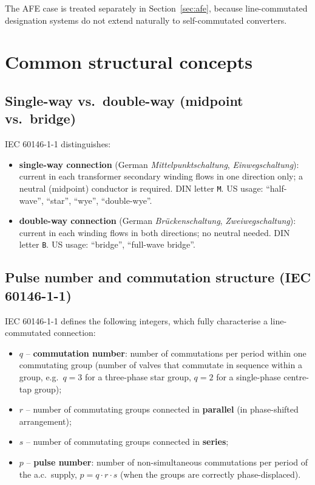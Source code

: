 \documentclass[11pt,a4paper]{article}
\newcommand{\code}[1]{\texttt{#1}}
\begin{document}
The AFE case is treated separately in Section~\ref{sec:afe}, because line-commutated designation systems do not extend naturally to self-commutated converters.

\section{Common structural concepts}

\subsection{Single-way vs.\ double-way (midpoint vs.\ bridge)}

IEC 60146-1-1 distinguishes:
\begin{itemize}
\item \textbf{single-way connection} (German \emph{Mittelpunktschaltung}, \emph{Einwegschaltung}): current in each transformer secondary winding flows in one direction only; a neutral (midpoint) conductor is required. DIN letter \code{M}. US usage: ``half-wave'', ``star'', ``wye'', ``double-wye''.
\item \textbf{double-way connection} (German \emph{Brückenschaltung}, \emph{Zweiwegschaltung}): current in each winding flows in both directions; no neutral needed. DIN letter \code{B}. US usage: ``bridge'', ``full-wave bridge''.
\end{itemize}

\subsection{Pulse number and commutation structure (IEC 60146-1-1)}

IEC 60146-1-1 defines the following integers, which fully characterise a line-commutated connection:
\begin{itemize}
\item $q$ -- \textbf{commutation number}: number of commutations per period within one commutating group (number of valves that commutate in sequence within a group, e.g.\ $q=3$ for a three-phase star group, $q=2$ for a single-phase centre-tap group);
\item $r$ -- number of commutating groups connected in \textbf{parallel} (in phase-shifted arrangement);
\item $s$ -- number of commutating groups connected in \textbf{series};
\item $p$ -- \textbf{pulse number}: number of non-simultaneous commutations per period of the a.c.\ supply, $p = q \cdot r \cdot s$ (when the groups are correctly phase-displaced).
\end{itemize}
\end{document}
